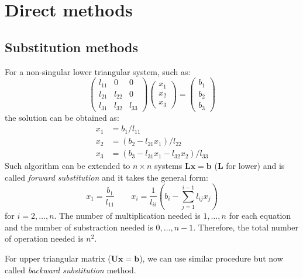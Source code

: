 \documentclass{article}
\begin{document}
\section{Direct methods}
\subsection{Substitution methods}
For a non-singular lower triangular system, such as:
\begin{equation*}
    \left(\begin{matrix}
        l_{11} & 0 & 0 \\
        l_{21} & l_{22} & 0 \\
        l_{31} & l_{32} & l_{33} 
    \end{matrix}\right)
    \left(\begin{matrix}
        x_1 \\ x_2 \\ x_3
    \end{matrix}\right) = 
    \left(\begin{matrix}
        b_1 \\ b_2 \\ b_3
    \end{matrix}\right)
\end{equation*}
the solution can be obtained as:
\begin{align*}
    x_1 &= b_1 / l_{11} \\
    x_2 &= (b_2 - l_{21} x_1 ) / l_{22} \\
    x_3 &= (b_3 - l_{31} x_1 - l_{32} x_2) / l_{33}
\end{align*}
Such algorithm can be extended to $n\times n$ systems 
$\mathbf{L}\mathbf{x} = \mathbf{b}$ ($\mathbf{L}$ for lower)
and is called \emph{forward substitution}
and it takes the general form:
\begin{equation}
    \label{forward_substitution}
    x_1 = \frac{b_1}{l_{11}} \qquad
    x_i = \frac{1}{l_{ii}} \left(b_i - \sum_{j = 1}^{i-1} l_{ij}x_j\right) 
\end{equation}
for $i = 2, \dots, n$. The number of multiplication needed is $1, \dots, n$ for each 
equation and the number of substraction needed is $0, \dots, n-1$. Therefore, the total 
number of operation needed is $n^2$. 

For upper triangular matrix ($\mathbf{U}\mathbf{x} = \mathbf{b}$), we can use similar procedure but now called 
\emph{backward substitution} method.
\end{document}
